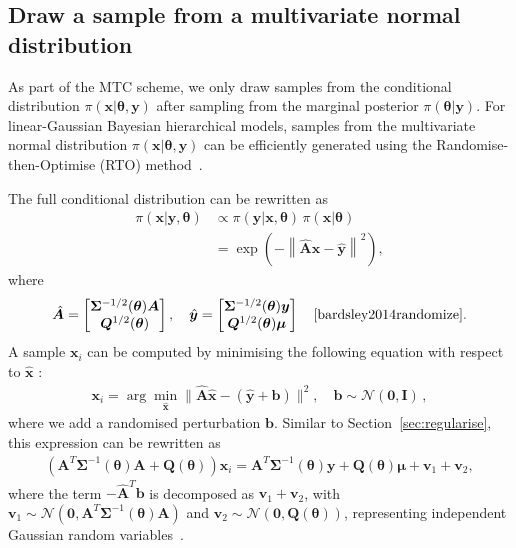 \subsection{Draw a sample from a multivariate normal distribution}
\label{subsec:RTO}
As part of the MTC scheme, we only draw samples from the conditional distribution $\pi(\bm{x} |  \bm{\theta}, \bm{y})$ after sampling from the marginal posterior $\pi(\bm{\theta} |  \bm{y})$. For linear-Gaussian Bayesian hierarchical models, samples from the multivariate normal distribution $\pi(\bm{x} |  \bm{\theta}, \bm{y})$ can be efficiently generated using the Randomise-then-Optimise (RTO) method~\cite{bardsley2012mcmc}.

The full conditional distribution can be rewritten as
\begin{align}
	\pi(\bm{x} |  \bm{y}, \bm{\theta}) &\propto \pi(\bm{y} |  \bm{x}, \bm{\theta}) \, \pi(\bm{x} |  \bm{\theta}) \\
	&= \exp \left( -\left\lVert \hat{\bm{A}} \bm{x} - \hat{\bm{y}} \right\rVert^2 \right),
\end{align}
where
\begin{align}
	\label{eq:minimizer}
	\hat{\bm{A}} = 
	\begin{bmatrix}
		\bm{\Sigma}^{-1/2}(\bm{\theta}) \bm{A} \\
		\bm{Q}^{1/2}(\bm{\theta})
	\end{bmatrix}, \quad 
	\hat{\bm{y}} = 
	\begin{bmatrix}
		\bm{\Sigma}^{-1/2}(\bm{\theta}) \bm{y} \\
		\bm{Q}^{1/2}(\bm{\theta}) \bm{\mu}
	\end{bmatrix} \quad \text{\cite{bardsley2014randomize}}.
\end{align}
A sample $\bm{x}_i $ can be computed by minimising the following equation with respect to $\hat{\bm{x}}$ :
\begin{align}
	\bm{x}_i = \arg \min_{\hat{\bm{x}}} \lVert \hat{\bm{A}} \hat{\bm{x}} - ( \hat{\bm{y}} + \bm{b} ) \rVert^2 , \quad \bm{b} \sim \mathcal{N}(\bm{0}, \mathbf{I}) \, ,
\end{align}
where we add a randomised perturbation $\bm{b}$.
Similar to Section~\ref{sec:regularise}, this expression can be rewritten as
\begin{align}
	\label{eq:RTO}
	\left( \bm{A}^T \bm{\Sigma}^{-1}(\bm{\theta}) \bm{A} + \bm{Q}(\bm{\theta}) \right) \bm{x}_i = \bm{A}^T \bm{\Sigma}^{-1}(\bm{\theta}) \bm{y} + \bm{Q}(\bm{\theta}) \bm{\mu} + \bm{v}_1 + \bm{v}_2,
\end{align}
where the term $-\hat{\bm{A}}^T \bm{b}$ is decomposed as $\bm{v}_1 + \bm{v}_2$, with $\bm{v}_1 \sim \mathcal{N}(\bm{0}, \bm{A}^T \bm{\Sigma}^{-1}(\bm{\theta}) \bm{A})$ and $\bm{v}_2 \sim \mathcal{N}(\bm{0}, \bm{Q}(\bm{\theta}))$, representing independent Gaussian random variables~\cite{bardsley2012mcmc, fox2016fast}.

